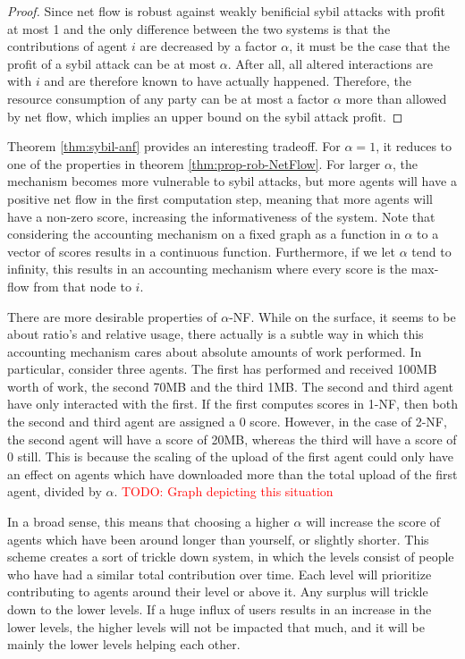 \documentclass[a4paper,11pt]{book}
\newcommand\musthave[1]{\textcolor{red}{TODO: #1}}
\theoremstyle{definition}
\begin{document}
\begin{proof}
    Since net flow is robust against weakly benificial sybil attacks with profit at most
    1 and the only difference between the two systems is that the contributions of
    agent $i$ are decreased by a factor $\alpha$, it must be the case that the profit
    of a sybil attack can be at most $\alpha$. After all, all altered interactions
    are with $i$ and are therefore known to have actually happened. Therefore, the
    resource consumption of any party can be at most a factor $\alpha$ more than allowed
    by net flow, which implies an upper bound on the sybil attack profit.
\end{proof}

Theorem \ref{thm:sybil-anf} provides an interesting tradeoff. For $\alpha=1$, it reduces
to one of the properties in theorem \ref{thm:prop-rob-NetFlow}. For larger $\alpha$,
the mechanism becomes more vulnerable to sybil attacks, but more agents will have
a positive net flow in the first computation step, meaning that more agents will
have a non-zero score, increasing the informativeness of the system. Note
that considering the accounting mechanism on a fixed graph as a function in $\alpha$ to
a vector of scores results in a continuous function. Furthermore, if we let $\alpha$
tend to infinity, this results in an accounting mechanism where every score is the
max-flow from that node to $i$. 


There are more desirable properties of $\alpha$-NF. While on the surface, it seems to
be about ratio's and relative usage, there actually is a subtle way in which
this accounting mechanism cares about absolute amounts of work performed. 
In particular, consider three agents. The first has performed and received
100MB worth of work, the second 70MB and the third 1MB. The second and third
agent have only interacted with the first. If the first computes scores
in 1-NF, then both the second and third agent are assigned a 0 score.
However, in the case of 2-NF, the second agent will have a score of 20MB,
whereas the third will have a score of 0 still. This is because the scaling
of the upload of the first agent could only have an effect on agents which
have downloaded more than the total upload of the first agent, divided
by $\alpha$. 
\musthave{Graph depicting this situation}

In a broad sense, this means that choosing a higher $\alpha$ will increase the score 
of agents which have been around longer than yourself, or slightly shorter. This
scheme creates a sort of trickle down system, in which the levels consist of people
who have had a similar total contribution over time. Each level will prioritize
contributing to agents around their level or above it. Any surplus will trickle down
to the lower levels. If a huge influx of users results in an increase in the lower
levels, the higher levels will not be impacted that much, and it will be mainly the
lower levels helping each other.
\end{document}
